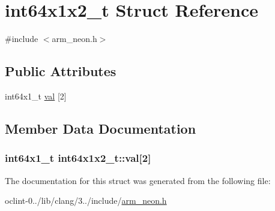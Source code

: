 \hypertarget{structint64x1x2__t}{\section{int64x1x2\-\_\-t Struct Reference}
\label{structint64x1x2__t}
}


{\ttfamily \#include $<$arm\-\_\-neon.\-h$>$}

\subsection*{Public Attributes}
\begin{DoxyCompactItemize}
\item 
int64x1\-\_\-t \hyperlink{structint64x1x2__t_a3fd848a151c8d387380dfc4e02e445e1}{val} \mbox{[}2\mbox{]}
\end{DoxyCompactItemize}


\subsection{Member Data Documentation}
\hypertarget{structint64x1x2__t_a3fd848a151c8d387380dfc4e02e445e1}{
\subsubsection[{val}]{\setlength{\rightskip}{0pt plus 5cm}int64x1\-\_\-t int64x1x2\-\_\-t\-::val\mbox{[}2\mbox{]}}}\label{structint64x1x2__t_a3fd848a151c8d387380dfc4e02e445e1}


The documentation for this struct was generated from the following file\-:\begin{DoxyCompactItemize}
\item 
oclint-\/0../lib/clang/3../include/\hyperlink{arm__neon_8h}{arm\-\_\-neon.\-h}\end{DoxyCompactItemize}
